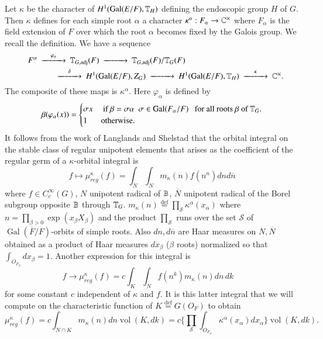 \documentclass{amsart}
\def\Gal{\operatorname{\text{Gal}}}          %
\def\Com{{\Bbb C}}                         %
\def\Def{\overset{\operatorname{def}}=}   %
\def\adj{\operatorname{adj}}
\def\Vol{\operatorname{vol}}
\def\CurlyS{{\mathcal S}}
\def\HALEST{11}
\def\HOWE{12}
\begin{document}
Let $\kappa$ be the character of $H^1(\Gal(E/F),\Bbb T_H)$ defining the
endoscopic group $H$ of $G$.  Then $\kappa$ defines \cite{\HALEST,VI-2} %
for each simple
root $\alpha$ a character $\kappa^\alpha:F_\alpha\to\Com^\times$
where $F_\alpha$ is the field extension of $F$ over which
the root $\alpha$ becomes fixed by the Galois group.
We recall the definition.  We have a sequence
\begin{align*}
\begin{CD}
F^\alpha
@>{\varphi_\alpha}>>
\Bbb T_{G,\adj}(F) @>>>
\Bbb T_{G,\adj}(F)/\Bbb T_G(F)
\end{CD}\qquad\qquad\qquad\qquad\qquad\qquad\\
\begin{CD}
\text{}\qquad\qquad @>\delta>>
H^1(\Gal(E/F),Z_G)
@>>>
H^1(\Gal(E/F),\Bbb T_H)
@>\kappa>> \Com^\times.
\end{CD}
\end{align*}
The composite of these maps is $\kappa^\alpha$.  Here
$\varphi_\alpha$ is defined by
$$
\beta(\varphi_\alpha(x)) =
\begin{cases}
\sigma x &\text{\ if\ } \beta=\sigma\alpha\ \ \sigma\in\Gal(F_\alpha/F)\ \ 
\text{\ for all roots\ }  \beta \text{\ of\ } \Bbb T_G.\\
1 &\text{otherwise}.
\end{cases}
$$
It follows from the work of Langlands and Shelstad that
the orbital integral on the
stable class of regular unipotent elements that arises
as the coefficient of the regular germ of a $\kappa$-orbital 
integral is
$$
f\mapsto
\mu_{reg}^\kappa(f) =
\int_{\overline N}\int_N
m_\kappa(n)f(n^{\overline n})dnd\overline n
$$
where $f\in C_c^\infty(G)$, $N$ unipotent radical of 
$\Bbb B$, $\overline N$ unipotent radical of
the Borel subgroup opposite $\Bbb B$ through $\Bbb T_G$.
$m_\kappa(n)\Def\prod_\CurlyS\kappa^\alpha(x_\alpha)$ where
$n=\prod_{\beta>0}\exp(x_\beta X_\beta)$
and the product $\prod_\CurlyS$ runs over the set $\CurlyS$ of
$\Gal(\overline F/F)$-orbits of simple roots.
Also $dn, d\overline n$ are Haar measures on 
$N,\overline N$ obtained as a product of Haar measures
$dx_\beta$ ($\beta$ roots) normalized so that
$\int_{O_{F_\beta}}dx_\beta = 1$.  Another expression for this
integral is \cite{\HOWE}
$$
f\to \mu_{reg}^\kappa(f)
= c\int_K\int_N
f(n^k)m_\kappa(n)dn\,dk\quad
$$
for some constant $c$ independent of $\kappa$ and $f$.  It is this
latter integral that we will compute on the
characteristic function of $K\Def G(O_F)$ to obtain
$$
\mu_{reg}^\kappa(f) = c\int_{N\cap K}
m_\kappa(n)dn\Vol(K,dk)
=c\{\prod_\CurlyS\int_{O_{F_\alpha}}
\kappa^\alpha(x_\alpha)dx_\alpha\}\Vol (K,dk).
$$
\end{document}
